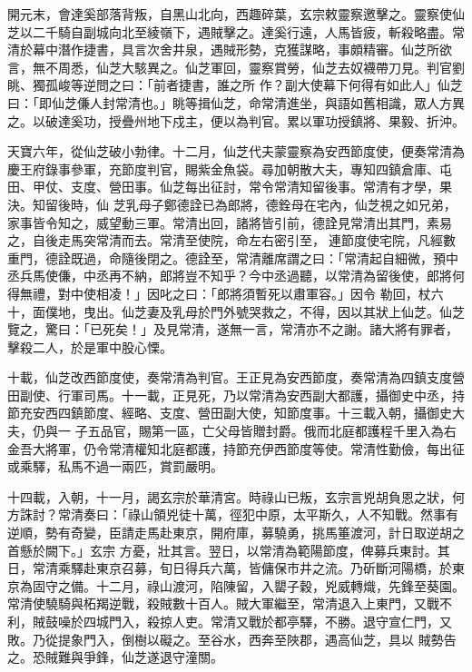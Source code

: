 \begin{pinyinscope}
 開元末，會達奚部落背叛，自黑山北向，西趣碎葉，玄宗敕靈察邀擊之。靈察使仙芝以二千騎自副城向北至綾嶺下，遇賊擊之。達奚行遠，人馬皆疲，斬殺略盡。常清於幕中潛作捷書，具言次舍井泉，遇賊形勢，克獲謀略，事頗精審。仙芝所欲言，無不周悉，仙芝大駭異之。仙芝軍回，靈察賞勞，仙芝去奴襪帶刀見。判官劉眺、獨孤峻等逆問之曰：「前者捷書，誰之所
 作？副大使幕下何得有如此人」仙芝曰：「即仙芝傔人封常清也。」眺等揖仙芝，命常清進坐，與語如舊相識，眾人方異之。以破達奚功，授疊州地下戍主，便以為判官。累以軍功授鎮將、果毅、折沖。



 天寶六年，從仙芝破小勃律。十二月，仙芝代夫蒙靈察為安西節度使，便奏常清為慶王府錄事參軍，充節度判官，賜紫金魚袋。尋加朝散大夫，專知四鎮倉庫、屯田、甲仗、支度、營田事。仙芝每出征討，常令常清知留後事。常清有才學，果決。知留後時，仙
 芝乳母子鄭德詮已為郎將，德銓母在宅內，仙芝視之如兄弟，家事皆令知之，威望動三軍。常清出回，諸將皆引前，德詮見常清出其門，素易之，自後走馬突常清而去。常清至使院，命左右密引至，連節度使宅院，凡經數重門，德詮既過，命隨後閉之。德詮至，常清離席謂之曰：「常清起自細微，預中丞兵馬使傔，中丞再不納，郎將豈不知乎？今中丞過聽，以常清為留後使，郎將何得無禮，對中使相凌！」因叱之曰：「郎將須暫死以肅軍容。」因令
 勒回，杖六十，面僕地，曳出。仙芝妻及乳母於門外號哭救之，不得，因以其狀上仙芝。仙芝覽之，驚曰：「已死矣！」及見常清，遂無一言，常清亦不之謝。諸大將有罪者，擊殺二人，於是軍中股心慄。



 十載，仙芝改西節度使，奏常清為判官。王正見為安西節度，奏常清為四鎮支度營田副使、行軍司馬。十一載，正見死，乃以常清為安西副大都護，攝御史中丞，持節充安西四鎮節度、經略、支度、營田副大使，知節度事。十三載入朝，攝御史大夫，仍與一
 子五品官，賜第一區，亡父母皆贈封爵。俄而北庭都護程千里入為右金吾大將軍，仍令常清權知北庭都護，持節充伊西節度等使。常清性勤儉，每出征或乘驛，私馬不過一兩匹，賞罰嚴明。



 十四載，入朝，十一月，謁玄宗於華清宮。時祿山已叛，玄宗言兇胡負恩之狀，何方誅討？常清奏曰：「祿山領兇徒十萬，徑犯中原，太平斯久，人不知戰。然事有逆順，勢有奇變，臣請走馬赴東京，開府庫，募驍勇，挑馬箠渡河，計日取逆胡之首懸於闕下。」玄宗
 方憂，壯其言。翌日，以常清為範陽節度，俾募兵東討。其日，常清乘驛赴東京召募，旬日得兵六萬，皆傭保市井之流。乃斫斷河陽橋，於東京為固守之備。十二月，祿山渡河，陷陳留，入罌子穀，兇威轉熾，先鋒至葵園。常清使驍騎與柘羯逆戰，殺賊數十百人。賊大軍繼至，常清退入上東門，又戰不利，賊鼓噪於四城門入，殺掠人吏。常清又戰於都亭驛，不勝。退守宣仁門，又敗。乃從提象門入，倒樹以礙之。至谷水，西奔至陜郡，遇高仙芝，具以
 賊勢告之。恐賊難與爭鋒，仙芝遂退守潼關。




\end{pinyinscope}
